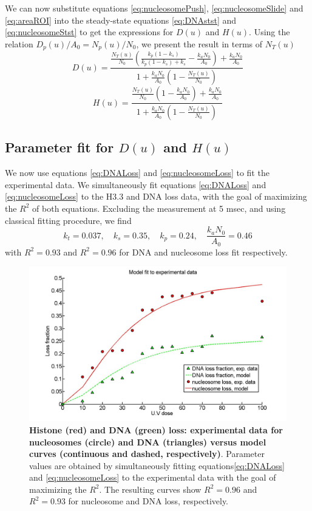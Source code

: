 \documentclass[12pt]{article}
\begin{document}
	We can now substitute equations \eqref{eq:nucleosomePush}, \eqref{eq:nucleosomeSlide} and \eqref{eq:areaROI} into the steady-state equations \eqref{eq:DNAstst} and \eqref{eq:nucleosomeStst} to get the expressions for $D(u)$ and $H(u)$. Using the relation $D_p(u)/A_0 = N_p(u)/N_0$, we present the result in terms of $N_T(u)$			
	\begin{equation}\label{eq:DNALoss}
	D(u) = \frac{\frac{N_T(u)}{N_0}\left(\frac{k_p(1-k_s)}{k_p(1-k_s)+k_s}-\frac{k_aN_0}{A_0}\right)+\frac{k_aN_0}{A_0}}{1+\frac{k_aN_0}{A_0}\left(1-\frac{N_T(u)}{N_0}\right)}
	\end{equation}
	\begin{equation}\label{eq:nucleosomeLoss}
		H(u) = \frac{\frac{N_T(u)}{N_0}\left(1-\frac{k_aN_0}{A_0}\right)+\frac{k_aN_0}{A_0}}{1+\frac{k_aN_0}{A_0}\left(1-\frac{N_T(u)}{N_0}\right)}
	\end{equation}
	
	\subsection{Parameter fit for $D(u)$ and $H(u)$}\label{subsection:parameterFit}
	We now use equations \eqref{eq:DNALoss}  and \eqref{eq:nucleosomeLoss} to fit the experimental data. We simultaneously fit equations \eqref{eq:DNALoss}  and \eqref{eq:nucleosomeLoss} to the H3.3 and DNA loss data, with the goal of maximizing the $R^2$ of both equations. Excluding the measurement at 5 msec, and using classical fitting procedure, we find
	\begin{equation*}
	k_t = 0.037, \quad k_s = 0.35,\quad k_p = 0.24, \quad \frac{k_aN_0}{A_0} = 0.46
	\end{equation*}
	with $R^2 = 0.93$ and $R^2 = 0.96$ for DNA and nucleosome loss fit respectively.
	
	
\begin{figure}[H]
\centering
\includegraphics[width=0.5\linewidth, height=0.3\textheight]{histoneAndDnaVsUvDoseModelFit}
\caption{\textbf{Histone (red) and DNA (green) loss: experimental data
	for nucleosomes (circle) and DNA (triangles) versus model curves
	(continuous and dashed, respectively)}. Parameter values are obtained
	by simultaneously fitting equations\eqref{eq:DNALoss}  and \eqref{eq:nucleosomeLoss} to the experimental data with
	the goal of maximizing the $R^2$. The resulting curves show $R^2 = 0.96$ and
	$R^2 = 0.93$ for nucleosome and DNA loss, respectively.}
\label{fig:histoneAndDnaVsUvDoseModelFit}
\end{figure}
\end{document}
